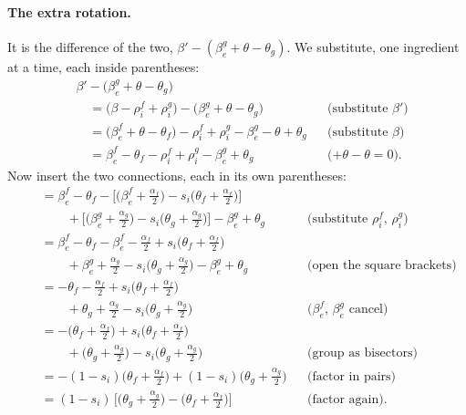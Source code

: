 \paragraph{The extra rotation.} It is the difference of the two, $\beta' - (\beta_e^g + \theta - \theta_g)$. We substitute, one ingredient at a time, each inside parentheses:
\begin{align*}
&\beta' - \big(\beta_e^g + \theta - \theta_g\big) \\
&\quad= \big(\beta - \rho_i^f + \rho_i^g\big) - \big(\beta_e^g + \theta - \theta_g\big) && \text{(substitute $\beta'$)} \\
&\quad= \big(\beta_e^f + \theta - \theta_f\big) - \rho_i^f + \rho_i^g - \beta_e^g - \theta + \theta_g && \text{(substitute $\beta$)} \\
&\quad= \beta_e^f - \theta_f - \rho_i^f + \rho_i^g - \beta_e^g + \theta_g && \text{($+\theta - \theta = 0$).}
\end{align*}
Now insert the two connections, each in its own parentheses:
\begin{align*}
&\quad= \beta_e^f - \theta_f - \Big[\Big(\beta_e^f + \frac{\alpha_f}2\Big) - s_i\Big(\theta_f + \frac{\alpha_f}2\Big)\Big] \\
&\quad\qquad + \Big[\Big(\beta_e^g + \frac{\alpha_g}2\Big) - s_i\Big(\theta_g + \frac{\alpha_g}2\Big)\Big] - \beta_e^g + \theta_g && \text{(substitute $\rho_i^f$, $\rho_i^g$)} \\
&\quad= \beta_e^f - \theta_f - \beta_e^f - \frac{\alpha_f}2 + s_i\Big(\theta_f + \frac{\alpha_f}2\Big) \\
&\quad\qquad + \beta_e^g + \frac{\alpha_g}2 - s_i\Big(\theta_g + \frac{\alpha_g}2\Big) - \beta_e^g + \theta_g && \text{(open the square brackets)} \\
&\quad= - \theta_f - \frac{\alpha_f}2 + s_i\Big(\theta_f + \frac{\alpha_f}2\Big) \\
&\quad\qquad + \theta_g + \frac{\alpha_g}2 - s_i\Big(\theta_g + \frac{\alpha_g}2\Big) && \text{($\beta_e^f$, $\beta_e^g$ cancel)} \\
&\quad= -\Big(\theta_f + \frac{\alpha_f}2\Big) + s_i\Big(\theta_f + \frac{\alpha_f}2\Big) \\
&\quad\qquad + \Big(\theta_g + \frac{\alpha_g}2\Big) - s_i\Big(\theta_g + \frac{\alpha_g}2\Big) && \text{(group as bisectors)} \\
&\quad= -(1 - s_i)\Big(\theta_f + \frac{\alpha_f}2\Big) + (1 - s_i)\Big(\theta_g + \frac{\alpha_g}2\Big) && \text{(factor in pairs)} \\
&\quad= (1 - s_i)\, \Big[ \Big(\theta_g + \frac{\alpha_g}2\Big) - \Big(\theta_f + \frac{\alpha_f}2\Big) \Big] && \text{(factor again).}
\end{align*}
